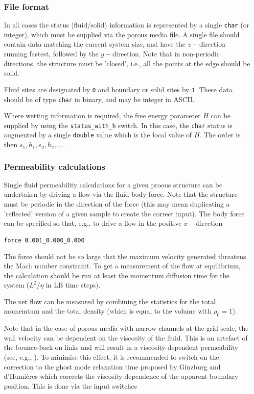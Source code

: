 \subsubsection{File format}

In all cases the status (fluid/solid) information is represented by a
single \texttt{char} (or integer), which must be supplied via the
porous media file. A single file should contain data matching the
current system size, and have the $z-$direction running fastest,
followed by the $y-$direction. Note that in non-periodic directions,
the structure must be 'closed', i.e., all the points at the edge
should be solid.

Fluid sites are designated by \texttt{0} and boundary or solid sites
by \texttt{1}. These data should be of type \texttt{char} in binary,
and may be integer in ASCII.

Where wetting information is required, the free energy parameter $H$
can be supplied by using the \texttt{status\_with\_h} switch. In this
case, the \texttt{char} status is augmented by a single \texttt{double}
value which is the local value of $H$. The order is then
$s_1,h_1, s_2, h_2, \ldots$.


\subsubsection{Permeability calculations}

Single fluid permeability calculations for a given proous structure
can be undertaken by driving a flow via the fluid body force. Note
that the structure must be periodic in the direction of the force
(this may mean duplicating a 'reflected' version of a given sample
to create the correct input). The body force can be specified so
that, e.g., to drive a flow in the positive $x-$direction

\texttt{force 0.001\_0.000\_0.000}

The force should not be so large that the maximum velocity generated
threatens the Mach number constraint. To get a measurement of the
flow at equilibrium, the calculation should be run at least the
momentum diffusion time for the system ($L^2/\eta$ in LB time steps).

The net flow can be measured by combining the statistics for the
total momemtum and the total density (which is equal to the volume
with $\rho_0 = 1$).

Note that in the case of porous media with narrow channels at the grid
scale, the wall velocity can be dependent on the viscosity of the fluid.
This is an artefact of the bounce-back on links and will result in a
viscosity-dependent permeability (see, e.g., \cite{lipanmiller}). To minimise
this effect, it is recommended to switch on the correction to the ghost
mode relaxation time proposed by Ginzburg and d'Humi\`eres \cite{ginzburg}
which corrects the viscosity-dependence of the apparent boundary
position. This is done via the input switches

